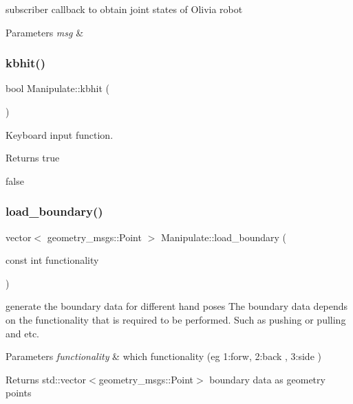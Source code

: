 subscriber callback to obtain joint states of Olivia robot 


\begin{DoxyParams}{Parameters}
{\em msg} & \\
\hline
\end{DoxyParams}
\mbox{\label{structManipulate_a404bf3531c8b6368c0b317062b3c30e4}} 
\subsubsection{\texorpdfstring{kbhit()}{kbhit()}}
{\footnotesize\ttfamily bool Manipulate\+::kbhit (\begin{DoxyParamCaption}{ }\end{DoxyParamCaption})\hspace{0.3cm}{\ttfamily [private]}}



Keyboard input function. 

\begin{DoxyReturn}{Returns}
true 

false 
\end{DoxyReturn}
\mbox{\label{structManipulate_a2aa3e3c677f9929cb4219b8785e1e225}} 
\subsubsection{\texorpdfstring{load\+\_\+boundary()}{load\_boundary()}}
{\footnotesize\ttfamily vector$<$ geometry\+\_\+msgs\+::\+Point $>$ Manipulate\+::load\+\_\+boundary (\begin{DoxyParamCaption}\item[{const int}]{functionality }\end{DoxyParamCaption})\hspace{0.3cm}{\ttfamily [private]}}



generate the boundary data for different hand poses The boundary data depends on the functionality that is required to be performed. Such as pushing or pulling and etc. 


\begin{DoxyParams}{Parameters}
{\em functionality} & which functionality (eg 1\+:forw, 2\+:back , 3\+:side ) \\
\hline
\end{DoxyParams}
\begin{DoxyReturn}{Returns}
std\+::vector$<$geometry\+\_\+msgs\+::\+Point$>$ boundary data as geometry points 
\end{DoxyReturn}
\mbox{\label{structManipulate_a0ccd3cd41e0cb39485fe962393e69efd}} 
